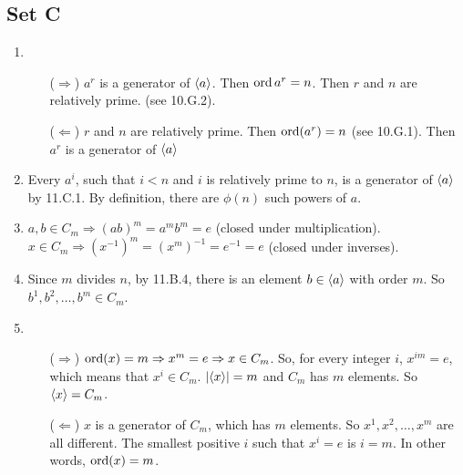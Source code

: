 \subsection{Set C}
\begin{enumerate}
    \item
    \begin{enumerate}
        \item [($\Rightarrow$)] $a^r$ is a generator of $\langle a\rangle$. Then $\operatorname{ord}{a^r} = n$. Then $r$ and $n$ are relatively prime. (see 10.G.2).
        \item [($\Leftarrow$)] $r$ and $n$ are relatively prime. Then $\operatorname{ord}(a^r) = n$ (see 10.G.1). Then $a^r$ is a generator of $\langle a\rangle$
    \end{enumerate}

    \item Every $a^i$, such that $i < n$ and $i$ is relatively prime to $n$, is a  generator of $\langle a\rangle$ by 11.C.1. By definition, there are $\phi(n)$ such powers of $a$. 
    
    \item $a, b \in C_m \Rightarrow (ab)^m = a^mb^m = e$ (closed under multiplication). $x \in C_m \Rightarrow (x^{-1})^m = (x^m)^{-1} = e^{-1} = e$ (closed under inverses).
    
    \item Since $m$ divides $n$, by 11.B.4, there is an element $b \in \langle a\rangle$ with order $m$. So $b^1, b^2, \ldots, b^m \in C_m$. 
    
    \item 
    \begin{enumerate}
        \item [($\Rightarrow$)] $\operatorname{ord}(x) = m \Rightarrow x^m = e \Rightarrow x \in C_m$. So, for every integer $i$, $x^{im} = e$, which means that $x^i \in C_m$. $|\langle x\rangle| = m$ and $C_m$ has $m$ elements. So $\langle x\rangle = C_m$.
        \item [($\Leftarrow$)] $x$ is a generator of $C_m$, which has $m$ elements. So $x^1, x^2, \ldots, x^{m}$ are all different. The smallest positive $i$ such that $x^i = e$ is $i = m$. In other words, $\operatorname{ord}(x) = m$.
    \end{enumerate}

\end{enumerate}
